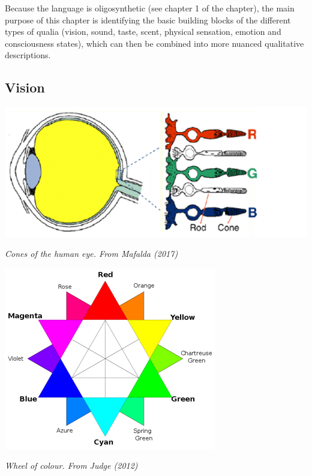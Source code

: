 Because the language is oligosynthetic (see chapter 1 of the chapter), the main purpose of this chapter is identifying the basic building blocks of the different types of qualia (vision, sound, taste, scent, physical sensation, emotion and consciousness states), which can then be combined into more nuanced qualitative descriptions.

\vspace*{-1cm}
\subsection{Vision}


\begin{center}
\includegraphics[scale=0.3]{./Images/eyes.jpeg}

{\it \footnotesize Cones of the human eye. From Mafalda (2017)}

\end{center}
\begin{center}

\includegraphics[scale=0.4]{./Images/colorwheel.jpg}

{\it \footnotesize Wheel of colour. From Judge (2012)}
\end{center}


